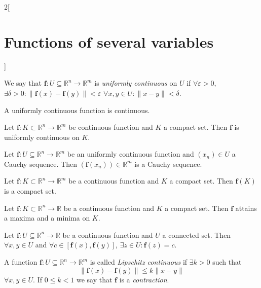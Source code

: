 \documentclass[class=article,10pt,crop=false]{standalone}
\begin{document}
\begin{multicols}{2}[\section{Functions of several variables}]
\begin{definition}
\end{definition}
\begin{definition}
We say that $\mathbf{\boldsymbol{f}}:U\subseteq\mathbb{R}^n\rightarrow\mathbb{R}^m$ is \textit{uniformly continuous} on $U$ if $\forall\varepsilon>0$, $\exists\delta>0:\|\mathbf{\boldsymbol{f}}(x)-\mathbf{\boldsymbol{f}}(y)\|<\varepsilon$ $\forall x,y\in U:\|x-y\|<\delta$.
\end{definition}
\begin{corollary}
A uniformly continuous function is continuous.
\end{corollary}
\begin{theorem}
Let $\mathbf{\boldsymbol{f}}:K\subset\mathbb{R}^n\rightarrow\mathbb{R}^m$ be continuous function and $K$ a compact set. Then $\mathbf{\boldsymbol{f}}$ is uniformly continuous on $K$.
\end{theorem}
\begin{theorem}
Let $\mathbf{\boldsymbol{f}}:U\subseteq\mathbb{R}^n\rightarrow\mathbb{R}^m$ be an uniformly continuous function and $(x_n)\in U$ a Cauchy sequence. Then $(\mathbf{\boldsymbol{f}}(x_n))\in\mathbb{R}^m$ is a Cauchy sequence.
\end{theorem}
\begin{theorem}
Let $\mathbf{\boldsymbol{f}}:K\subset\mathbb{R}^n\rightarrow\mathbb{R}^m$ be a continuous function and $K$ a compact set. Then $\mathbf{\boldsymbol{f}}(K)$ is a compact set.
\end{theorem}
\begin{theorem}
Let $\boldsymbol{f}:K\subset\mathbb{R}^n\rightarrow\mathbb{R}$ be a continuous function and $K$ a compact set. Then $\boldsymbol{f}$ attains a maxima and a minima on $K$.
\end{theorem}
\begin{theorem}
Let $\boldsymbol{f}:U\subseteq\mathbb{R}^n\rightarrow\mathbb{R}$ be a continuous function and $U$ a connected set. Then $\forall x,y\in U$ and $\forall c\in[\boldsymbol{f}(x),\boldsymbol{f}(y)]$, $\exists z\in U:\boldsymbol{f}(z)=c$.
\end{theorem}
\begin{definition}
A function $\mathbf{\boldsymbol{f}}:U\subseteq\mathbb{R}^n\rightarrow\mathbb{R}^m$ is called \textit{Lipschitz continuous} if $\exists k>0$ such that $$\|\mathbf{\boldsymbol{f}}(x)-\mathbf{\boldsymbol{f}}(y)\|\leq k\|x-y\|$$ $\forall x,y\in U$. If $0\leq k<1$ we say that $\mathbf{\boldsymbol{f}}$ is a \textit{contraction}.
\end{definition}

\end{multicols}
\end{document}
